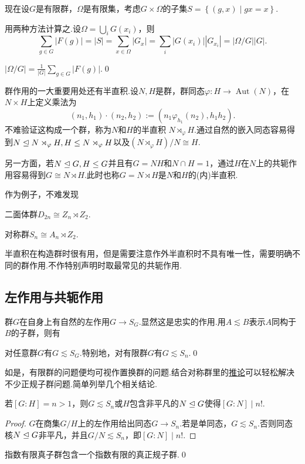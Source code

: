 现在设$G$是有限群，$\Omega$是有限集，考虑$G\times\Omega$的子集$S=\left\{(g,x)\mid gx=x\right\}$.

用两种方法计算之.设$\Omega=\bigcup_i G(x_i)$，则
\[
	\sum_{g\in G}|F(g)|=|S|=\sum_{x\in\Omega}|G_x|=\sum_i|G(x_i)||G_{x_i}|=|\Omega/G||G|.
\]
\begin{thm}[(Burnside引理)]
	$\displaystyle|\Omega/G|=\frac{1}{|G|}\sum_{g\in G}|F(g)|$.\qed
\end{thm}

群作用的一大重要用处还有\hypertarget{text:Semidirect}{半直积}.设$N,H$是群，群同态$\varphi\colon H\to\operatorname*{Aut}(N)$，在$N\times H$上定义乘法为
\[
	(n_1,h_1)\cdot(n_2,h_2):=(n_1\varphi_{h_1}(n_2),h_1h_2).
\]
不难验证这构成一个群，称为$N$和$H$的{\heiti 半直积} $N\rtimes_\varphi H$.通过自然的嵌入同态容易得到$N\trianglelefteq N\rtimes_\varphi H,H\le N\rtimes_\varphi H$以及$(N\rtimes_\varphi H)/N\cong H$.

另一方面，若$N\trianglelefteq G,H\le G$并且有$G=NH$和$N\cap H=1$，通过$H$在$N$上的共轭作用容易得到$G\cong N\rtimes H$.此时也称$G=N\rtimes H$是$N$和$H$的{\heiti (内)半直积}.

作为例子，不难发现
\par\begin{itemize*}
	\item 二面体群$D_{2n}\cong Z_n\rtimes Z_2$.\phantom{\qquad}
	\item 对称群$S_n\cong A_n\rtimes Z_2$.
\end{itemize*}\par
\medskip 半直积在构造群时很有用，但是需要注意作外半直积时不具有唯一性，需要明确不同的群作用.不作特别声明时取最常见的共轭作用.

\subsection{左作用与共轭作用}
群$G$在自身上有自然的左作用$G\to S_G$.显然这是忠实的作用.用$A\lesssim B$表示$A$同构于$B$的子群，则有
\begin{thm}[(Cayley)]
	对任意群$G$有$G\lesssim S_G$.特别地，对有限群$G$有$G\lesssim S_n$.\qed\hypertarget{thm:Cayley}{}
\end{thm}

如是，有限群的问题便均可视作置换群的问题.结合对称群里的\hyperlink{cor:Index2Permutation}{推论}可以轻松解决不少正规子群问题.简单列举几个相关结论.
\begin{prop}
	若$[G:H]=n>1$，则$G\lesssim S_n$\footnotemark 或$H$包含非平凡的$N\trianglelefteq G$使得$[G:N]\mid n!$.
\end{prop}
\begin{proof}
	$G$在商集$G/H$上的左作用给出同态$G\to S_n$.若是单同态，$G\lesssim S_n$.否则同态核$N\trianglelefteq G$非平凡，并且$G/N\lesssim S_n$，即$[G:N]\mid n!$.
\end{proof}
\begin{cor*}
	指数有限真子群包含一个指数有限的真正规子群.\qed
\end{cor*}

